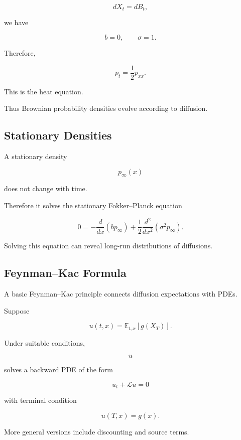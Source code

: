 \[
dX_t=dB_t,
\]

we have

\[
b=0,
\qquad
\sigma=1.
\]

Therefore,

\[
\boxed{
p_t
=
\frac12p_{xx}.
}
\]

This is the heat equation.

Thus Brownian probability densities evolve according to diffusion.

\subsection{Stationary Densities}
\label{subsec:stationary-densities-sde}

A stationary density

\[
p_\infty(x)
\]

does not change with time.

Therefore it solves the stationary Fokker--Planck equation

\[
\boxed{
0
=
-
\frac{d}{dx}
(bp_\infty)
+
\frac12
\frac{d^2}{dx^2}
(\sigma^2p_\infty).
}
\]

Solving this equation can reveal long-run distributions of diffusions.

\subsection{Feynman--Kac Formula}
\label{subsec:feynman-kac-sde}

A basic Feynman--Kac principle connects diffusion expectations with PDEs.

Suppose

\[
u(t,x)
=
\mathbb{E}_{t,x}
\left[
g(X_T)
\right].
\]

Under suitable conditions,

\[
u
\]

solves a backward PDE of the form

\[
\boxed{
u_t
+
\mathcal{L}u
=
0
}
\]

with terminal condition

\[
\boxed{
u(T,x)=g(x).
}
\]

More general versions include discounting and source terms.

